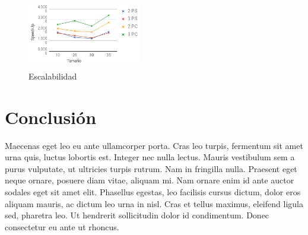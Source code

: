 \documentclass[10pt,twocolumn,a4paper]{article}
\begin{document}
\begin{figure}[H]
\begin{center}
\includegraphics[height=3cm, width=5cm]{grafico4}
\caption{Escalabilidad}
\end{center}
\end{figure}
\section{Conclusión}
Maecenas eget leo eu ante ullamcorper porta. Cras leo turpis, fermentum sit amet urna quis, luctus lobortis est. Integer nec nulla lectus. Mauris vestibulum sem a purus vulputate, ut ultricies turpis rutrum. Nam in fringilla nulla. Praesent eget neque ornare, posuere diam vitae, aliquam mi. Nam ornare enim id ante auctor sodales eget sit amet elit. Phasellus egestas, leo facilisis cursus dictum, dolor eros aliquam mauris, ac dictum leo urna in nisl. Cras et tellus maximus, eleifend ligula sed, pharetra leo. Ut hendrerit sollicitudin dolor id condimentum. Donec consectetur eu ante ut rhoncus.


\end{document}
